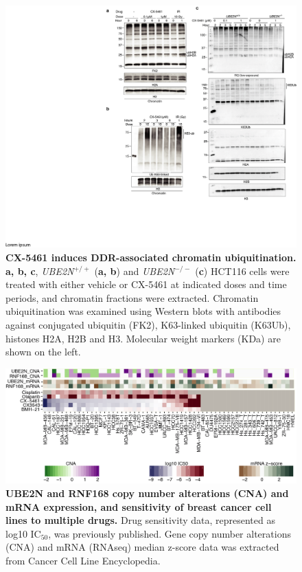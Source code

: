\begin{figure}
    \centering
    \includegraphics[width=1\textwidth]{supplement/figures/chromatin_ub_westerns}
    \caption[CX-5461-induced chromatin ubiquitination]
            {\small{\textbf{CX-5461 induces DDR-associated chromatin ubiquitination.}}
            \textbf{a, b, c}, \textit{UBE2N$^{+/+}$} (\textbf{a, b}) and \textit{UBE2N$^{-/-}$} (\textbf{c}) HCT116 cells were treated with either vehicle or CX-5461 at indicated doses and time periods, and chromatin fractions were extracted. Chromatin ubiquitination was examined using Western blots with antibodies against conjugated ubiquitin (FK2), K63-linked ubiquitin (K63Ub), histones H2A, H2B and H3. Molecular weight markers (KDa) are shown on the left. 
            }
        \label{sfig:chromatin_ub_westerns}
\end{figure}

\begin{figure}
    \centering
    \includegraphics[width=1\textwidth]{supplement/figures/cell_lines_sensitivity.png}
    \caption[Sensitivity of breast cancer cell lines to CX-5461]
            {\small{\textbf{UBE2N and RNF168 copy number alterations (CNA) and mRNA expression, and sensitivity of breast cancer cell lines to multiple drugs.}}
            Drug sensitivity data, represented as log10 IC$_{50}$, was previously published\cite{Xu2017}. Gene copy number alterations (CNA) and mRNA (RNAseq) median z-score data was extracted from Cancer Cell Line Encyclopedia\cite{Barretina2012}.  
            }
        \label{sfig:cell_line_sensitivity}
\end{figure}


